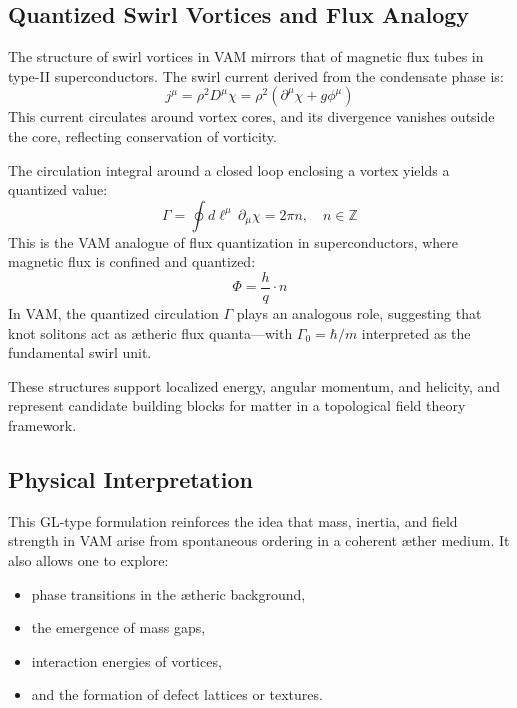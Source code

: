 \documentclass[a4paper,12pt]{article}
\begin{document}
        \subsection{Quantized Swirl Vortices and Flux Analogy}
        The structure of swirl vortices in VAM mirrors that of magnetic flux tubes in type-II superconductors. The swirl current derived from the condensate phase is:
        \begin{equation}
            j^\mu = \rho^2 D^\mu \chi = \rho^2 (\partial^\mu \chi + g \phi^\mu)
        \end{equation}
        This current circulates around vortex cores, and its divergence vanishes outside the core, reflecting conservation of vorticity.

        The circulation integral around a closed loop enclosing a vortex yields a quantized value:
        \begin{equation}
            \Gamma = \oint d\ell^\mu \, \partial_\mu \chi = 2\pi n, \quad n \in \mathbb{Z}
        \end{equation}
        This is the VAM analogue of flux quantization in superconductors, where magnetic flux is confined and quantized:
        \begin{equation}
            \Phi = \frac{h}{q} \cdot n
        \end{equation}
        In VAM, the quantized circulation $\Gamma$ plays an analogous role, suggesting that knot solitons act as ætheric flux quanta---with $\Gamma_0 = \hbar / m$ interpreted as the fundamental swirl unit.

        These structures support localized energy, angular momentum, and helicity, and represent candidate building blocks for matter in a topological field theory framework.

        \subsection{Physical Interpretation}
        This GL-type formulation reinforces the idea that mass, inertia, and field strength in VAM arise from spontaneous ordering in a coherent æther medium. It also allows one to explore:
        \begin{itemize}
            \item phase transitions in the ætheric background,
            \item the emergence of mass gaps,
            \item interaction energies of vortices,
            \item and the formation of defect lattices or textures.
        \end{itemize}
\end{document}
